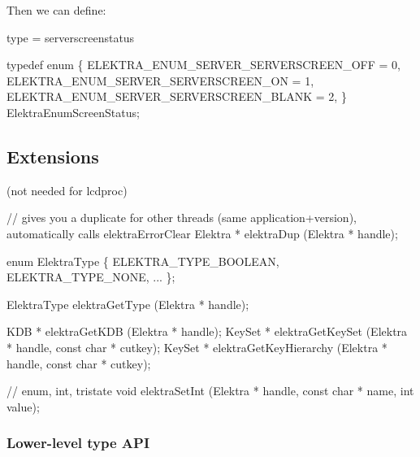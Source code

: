 

Then we can define\+:


\begin{DoxyCode}
type = serverscreenstatus
\end{DoxyCode}



\begin{DoxyCode}
typedef enum
\{
        ELEKTRA\_ENUM\_SERVER\_SERVERSCREEN\_OFF = 0,
        ELEKTRA\_ENUM\_SERVER\_SERVERSCREEN\_ON = 1,
        ELEKTRA\_ENUM\_SERVER\_SERVERSCREEN\_BLANK = 2,
\} ElektraEnumScreenStatus;
\end{DoxyCode}


\subsection*{Extensions}

(not needed for lcdproc)


\begin{DoxyCode}
\textcolor{comment}{// gives you a duplicate for other threads (same application+version), automatically calls
       elektraErrorClear}
Elektra * elektraDup (Elektra * handle);

\textcolor{keyword}{enum} ElektraType
\{
        ELEKTRA\_TYPE\_BOOLEAN,
        ELEKTRA\_TYPE\_NONE,
        ...
\};

ElektraType elektraGetType (Elektra * handle);

KDB * elektraGetKDB (Elektra * handle);
KeySet * elektraGetKeySet (Elektra * handle, \textcolor{keyword}{const} \textcolor{keywordtype}{char} * cutkey);
KeySet * elektraGetKeyHierarchy (Elektra * handle, \textcolor{keyword}{const} \textcolor{keywordtype}{char} * cutkey);

\textcolor{comment}{// enum, int, tristate}
\textcolor{keywordtype}{void} elektraSetInt (Elektra * handle, \textcolor{keyword}{const} \textcolor{keywordtype}{char} * name, \textcolor{keywordtype}{int} value);
\end{DoxyCode}


\subsubsection*{Lower-\/level type A\+PI}

